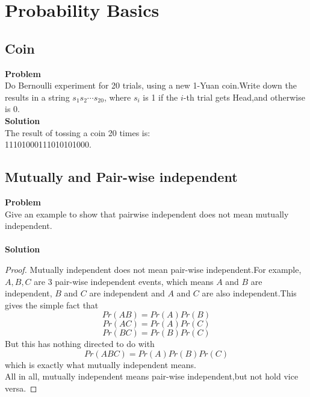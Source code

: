 
\chapter{Probability Basics}

	\section{Coin}
	\textbf{Problem}\\
	Do Bernoulli experiment for 20 trials, using a new 1-Yuan coin.Write down the results in a string $s_1 s_2 \cdots s_{20}$, where $s_i$ is 1 if the $i$-th trial gets Head,and otherwise is 0.
	\\
	\textbf{Solution}\\
	The result of tossing a coin 20 times is:\\11101000111010101000.
	
	\section{Mutually and Pair-wise independent}
	\textbf{Problem}\\
	Give an example to show that pairwise independent does not mean mutually independent.\\\\
	\textbf{Solution}\\
	\begin{proof}
			Mutually independent does not mean pair-wise independent.For example,$A,B,C$ are 3 pair-wise independent events, which means $A$ and $B$ are independent, $B$ and $C$ are independent and $A$ and $C$ are also independent.This gives the simple fact that 
		\[ Pr(AB)=Pr(A)Pr(B) \]
		\[ Pr(AC)=Pr(A)Pr(C) \]
		\[ Pr(BC)=Pr(B)Pr(C) \]
		But this has nothing directed to do with 
		\[ Pr(ABC)=Pr(A)Pr(B)Pr(C) \]
		which is exactly what mutually independent means.\\
		All in all, mutually independent means pair-wise independent,but not hold vice versa.
	\end{proof}
	
